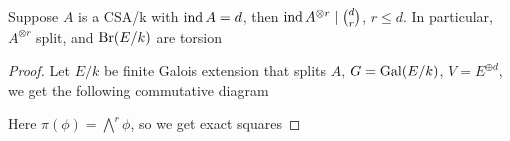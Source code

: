 \documentclass[a4paper,10pt]{article}
\begin{document}
\begin{proposition}
Suppose $A$ is a CSA/k with $\operatorname{ind} A=d$, then $\operatorname{ind} A^{\otimes r}\mid\binom{d}{r}$, $r\leq d$. In particular, $A^{\otimes r}$ split, and $\operatorname{Br}(E/k)$ are torsion
\end{proposition}

\begin{proof}
Let $E/k$ be finite Galois extension that splits $A$, $G=\operatorname{Gal}(E/k)$, $V=E^{\oplus d}$, we get the following commutative diagram
\begin{center}
\end{center}
Here $\pi(\phi)=\bigwedge^r\phi$, so we get exact squares

\end{proof}
\end{document}
